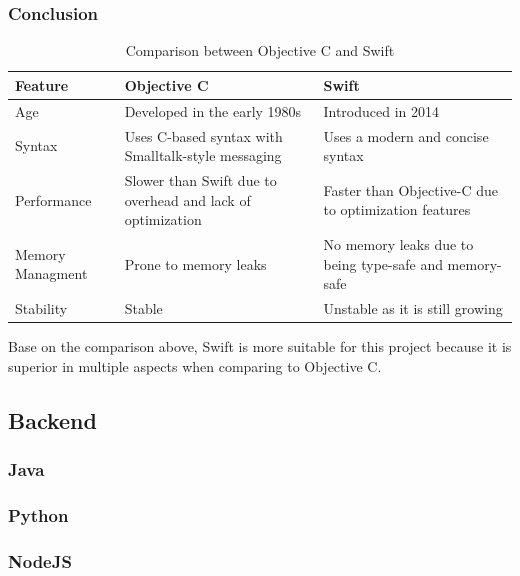 \subsubsection{Conclusion}

\begin{table}[H]
    \centering
    \begin{tabular}{| >{\centering\arraybackslash}m{2cm} | >{\centering\arraybackslash}m{6cm} | >{\centering\arraybackslash}m{6cm} |}
        \hline
        \textbf{Feature} & \textbf{Objective C} & \textbf{Swift} \\ \hline
        Age & Developed in the early 1980s & Introduced in 2014 \\ \hline
        Syntax & Uses C-based syntax with Smalltalk-style messaging & Uses a modern and concise syntax \\ \hline
        Performance & Slower than Swift due to overhead and lack of optimization & Faster than Objective-C due to optimization features \\ \hline
        Memory Managment & Prone to memory leaks & No memory leaks due to being type-safe and memory-safe \\ \hline
        Stability & Stable & Unstable as it is still growing \\ \hline
    \end{tabular}
    \caption{Comparison between Objective C and Swift}
\end{table}

Base on the comparison above, Swift is more suitable for this project because it is superior in multiple aspects when comparing to Objective C.

\subsection{Backend}

\subsubsection{Java}



\subsubsection{Python}


\subsubsection{NodeJS}



